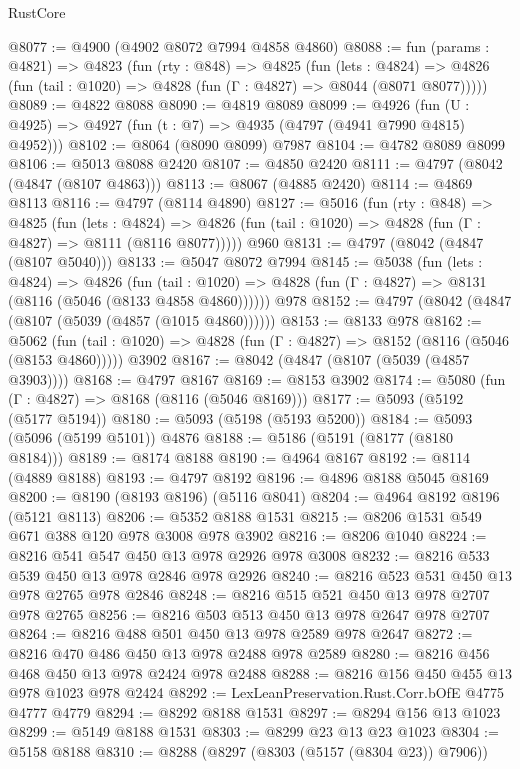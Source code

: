 \begin{lexlean}{RustCore}
\begin{coremodule}
@8077 := @4900 (@4902 @8072 @7994 @4858 @4860)
@8088 := fun (params : @4821) =>
  @4823
    (fun (rty : @848) =>
    @4825
      (fun (lets : @4824) =>
      @4826 (fun (tail : @1020) => @4828 (fun (Γ : @4827) => @8044 (@8071 @8077)))))
@8089 := @4822 @8088
@8090 := @4819 @8089
@8099 := @4926 (fun (U : @4925) => @4927 (fun (t : @7) => @4935 (@4797 (@4941 @7990 @4815) @4952)))
@8102 := @8064 (@8090 @8099) @7987
@8104 := @4782 @8089 @8099
@8106 := @5013 @8088 @2420
@8107 := @4850 @2420
@8111 := @4797 (@8042 (@4847 (@8107 @4863)))
@8113 := @8067 (@4885 @2420)
@8114 := @4869 @8113
@8116 := @4797 (@8114 @4890)
@8127 := @5016
    (fun (rty : @848) =>
    @4825
      (fun (lets : @4824) =>
      @4826 (fun (tail : @1020) => @4828 (fun (Γ : @4827) => @8111 (@8116 @8077)))))
    @960
@8131 := @4797 (@8042 (@4847 (@8107 @5040)))
@8133 := @5047 @8072 @7994
@8145 := @5038
    (fun (lets : @4824) =>
    @4826
      (fun (tail : @1020) => @4828 (fun (Γ : @4827) => @8131 (@8116 (@5046 (@8133 @4858 @4860))))))
    @978
@8152 := @4797 (@8042 (@4847 (@8107 (@5039 (@4857 (@1015 @4860))))))
@8153 := @8133 @978
@8162 := @5062
    (fun (tail : @1020) => @4828 (fun (Γ : @4827) => @8152 (@8116 (@5046 (@8153 @4860)))))
    @3902
@8167 := @8042 (@4847 (@8107 (@5039 (@4857 @3903))))
@8168 := @4797 @8167
@8169 := @8153 @3902
@8174 := @5080 (fun (Γ : @4827) => @8168 (@8116 (@5046 @8169)))
@8177 := @5093 (@5192 (@5177 @5194))
@8180 := @5093 (@5198 (@5193 @5200))
@8184 := @5093 (@5096 (@5199 @5101)) @4876
@8188 := @5186 (@5191 (@8177 (@8180 @8184)))
@8189 := @8174 @8188
@8190 := @4964 @8167
@8192 := @8114 (@4889 @8188)
@8193 := @4797 @8192
@8196 := @4896 @8188 @5045 @8169
@8200 := @8190 (@8193 @8196) (@5116 @8041)
@8204 := @4964 @8192 @8196 (@5121 @8113)
@8206 := @5352 @8188 @1531
@8215 := @8206 @1531 @549 @671 @388 @120 @978 @3008 @978 @3902
@8216 := @8206 @1040
@8224 := @8216 @541 @547 @450 @13 @978 @2926 @978 @3008
@8232 := @8216 @533 @539 @450 @13 @978 @2846 @978 @2926
@8240 := @8216 @523 @531 @450 @13 @978 @2765 @978 @2846
@8248 := @8216 @515 @521 @450 @13 @978 @2707 @978 @2765
@8256 := @8216 @503 @513 @450 @13 @978 @2647 @978 @2707
@8264 := @8216 @488 @501 @450 @13 @978 @2589 @978 @2647
@8272 := @8216 @470 @486 @450 @13 @978 @2488 @978 @2589
@8280 := @8216 @456 @468 @450 @13 @978 @2424 @978 @2488
@8288 := @8216 @156 @450 @455 @13 @978 @1023 @978 @2424
@8292 := LexLeanPreservation.Rust.Corr.bOfE @4775 @4777 @4779
@8294 := @8292 @8188 @1531
@8297 := @8294 @156 @13 @1023
@8299 := @5149 @8188 @1531
@8303 := @8299 @23 @13 @23 @1023
@8304 := @5158 @8188
@8310 := @8288 (@8297 (@8303 (@5157 (@8304 @23)) @7906))

\end{coremodule}
\end{lexlean}
